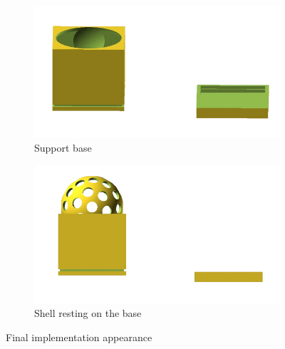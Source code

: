 \begin{figure}[H]
    \centering
    \begin{subfigure}[b]{0.4\linewidth}
        \includegraphics[width=\linewidth]{images/Supports.png}
        \caption{Support base}
    \end{subfigure}
    \begin{subfigure}[b]{0.4\linewidth}
        \includegraphics[width=\linewidth]{images/Jammer+Supports.png}
        \caption{Shell resting on the base}
    \end{subfigure}
    \caption{Final implementation appearance}
\end{figure}
